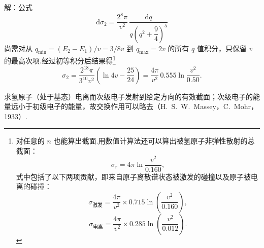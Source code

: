 解：公式
\begin{equation*}
  \mathrm{d}\sigma_2=\frac{2^8\pi}{v^2}\,
  \frac{\mathrm{d}q}{q\left(q^2+\dfrac{9}{4}\right)^5}
\end{equation*}
尚需对从 $q_{\mathrm{min}}=(E_2-E_1)/v=3/8v$ 到 $q_{\mathrm{max}}=2v$ 的所有 $q$ 值积分，只保留 $v$ 的最高次项.经过初等积分后结果得\footnote{对任意的 $n$ 也能算出截面.用数值计算法还可以算出被氢原子非弹性散射的总截面：
\begin{equation*}
  \sigma_r=4\pi\ln\frac{v^2}{0.160},
\end{equation*}
式中包括了以下两项贡献，即来自原子离散谱状态被激发的碰撞以及原子被电离的碰撞：
\begin{equation*}
  \sigma_{\text{激发}}=\frac{4\pi}{v^2}\times0.715\ln\left(\frac{v^2}{0.160}\right),
\end{equation*}
\begin{equation*}
  \sigma_{\text{电离}}=\frac{4\pi}{v^2}\times0.285\ln\left(\frac{v^2}{0.012}\right).
\end{equation*}}
\begin{equation*}
  \sigma_2=\frac{2^{18}\pi}{3^{10}v^2}\left(\ln4v-\frac{25}{24}\right)
  =\frac{4\pi}{v^2}\,0.555\ln\frac{v^2}{0.50}.
\end{equation*}

\quad 求氢原子（处于基态）电离而次级电子发射到给定方向的有效截面；次级电子的能量远小于初级电子的能量，故交换作用可以略去（H.~S.~W.~Massey，C.~Mohr，1933）.

